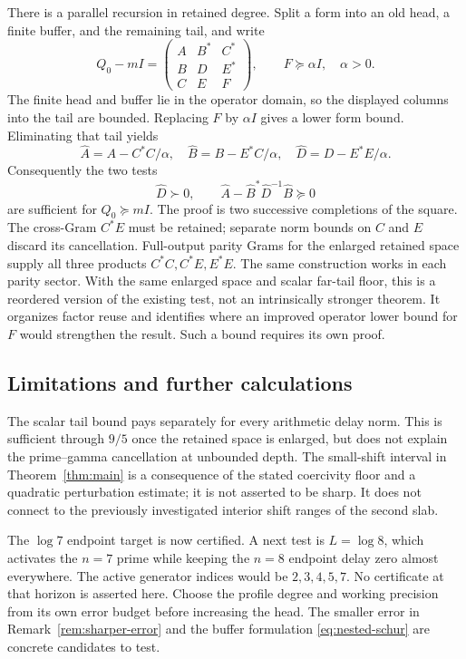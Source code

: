 \documentclass[11pt]{article}
\numberwithin{equation}{section}
\theoremstyle{definition}
\theoremstyle{remark}
\begin{document}
There is a parallel recursion in retained degree. Split a form into an old
head, a finite buffer, and the remaining tail, and write
\[
 Q_0-mI=\begin{pmatrix}
 A&B^*&C^*\\B&D&E^*\\C&E&F
 \end{pmatrix},\qquad F\succeq\alpha I,\quad\alpha>0.
\]
The finite head and buffer lie in the operator domain, so the displayed
columns into the tail are bounded. Replacing $F$ by $\alpha I$ gives a
lower form bound. Eliminating that tail yields
\[
 \widehat A=A-C^*C/\alpha,\quad
 \widehat B=B-E^*C/\alpha,\quad
 \widehat D=D-E^*E/\alpha.
\]
Consequently the two tests
\begin{equation}\label{eq:nested-schur}
 \widehat D\succ0,\qquad
 \widehat A-\widehat B^*\widehat D^{-1}\widehat B\succeq0
\end{equation}
are sufficient for $Q_0\succeq mI$. The proof is two successive
completions of the square. The cross-Gram $C^*E$ must be retained;
separate norm bounds on $C$ and $E$ discard its cancellation.
Full-output parity Grams for the enlarged retained space supply all three
products $C^*C,C^*E,E^*E$. The same construction works in each parity sector.
With the same enlarged space and scalar far-tail floor, this is a reordered
version of the existing test, not an intrinsically stronger theorem. It
organizes factor reuse and identifies where an improved operator lower bound
for $F$ would strengthen the result. Such a bound requires its own proof.

\subsection{Limitations and further calculations}

The scalar tail bound pays separately for every arithmetic delay norm.
This is sufficient through $9/5$ once the retained space is enlarged, but
does not explain the prime--gamma cancellation at unbounded depth. The
small-shift interval in Theorem~\ref{thm:main} is a consequence of the stated
coercivity floor and a quadratic perturbation estimate; it is not asserted
to be sharp. It does not connect to the previously investigated interior
shift ranges of the second slab.

The $\log7$ endpoint target is now certified. A next test is $L=\log8$,
which activates the $n=7$ prime while keeping the $n=8$ endpoint delay zero
almost everywhere. The active generator indices would be $2,3,4,5,7$.
No certificate at that horizon is asserted here. Choose the profile degree
and working precision from its own error budget before increasing the head.
The smaller error in Remark~\ref{rem:sharper-error} and the buffer
formulation \eqref{eq:nested-schur} are concrete candidates to test.
\end{document}
